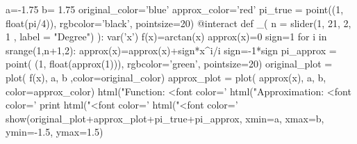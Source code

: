\documentclass[12pt]{article}
\begin{document}
\begin{sageverbatim}
a=-1.75
b= 1.75
original_color='blue'
approx_color='red'
pi_true = point((1, float(pi/4)), rgbcolor='black', pointsize=20)
@interact
def _( n = slider(1, 21, 2, 1 , label = "Degree") ):
    var('x')
    f(x)=arctan(x)
    approx(x)=0
    sign=1
    for i in srange(1,n+1,2):
        approx(x)=approx(x)+sign*x^i/i
        sign=-1*sign
    pi_approx = point( (1, float(approx(1))), rgbcolor='green', pointsize=20)
    original_plot = plot( f(x), a, b ,color=original_color)
    approx_plot = plot( approx(x),  a, b, color=approx_color)
    html("Function: <font color='%
    html("Approximation: <font color='%
    print
    html("<font color='%
    html("<font color='%
    show(original_plot+approx_plot+pi_true+pi_approx, xmin=a, xmax=b, ymin=-1.5, ymax=1.5)
\end{sageverbatim}
%
%
\end{document}
